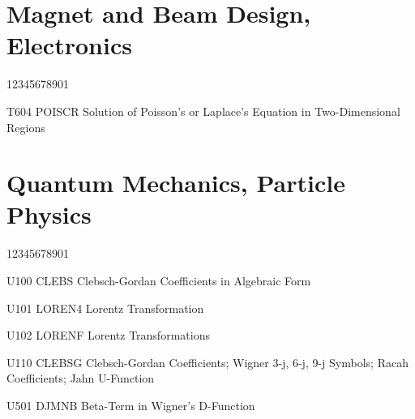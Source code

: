 \section*{Magnet and Beam Design, Electronics}
\begin{DLtt}{12345678901}
\item[T604 POISCR] Solution of Poisson's or Laplace's Equation in Two-Dimensional Regions
\end{DLtt}
\section*{Quantum Mechanics, Particle Physics}
\begin{DLtt}{12345678901}
\item[U100 CLEBS] Clebsch-Gordan Coefficients in Algebraic Form
\item[U101 LOREN4] Lorentz Transformation
\item[U102 LORENF] Lorentz Transformations
\item[U110 CLEBSG] Clebsch-Gordan Coefficients; Wigner 3-j, 6-j, 9-j Symbols; Racah Coefficients; Jahn U-Function
\item[U501 DJMNB] Beta-Term in Wigner's D-Function
\end{DLtt}
